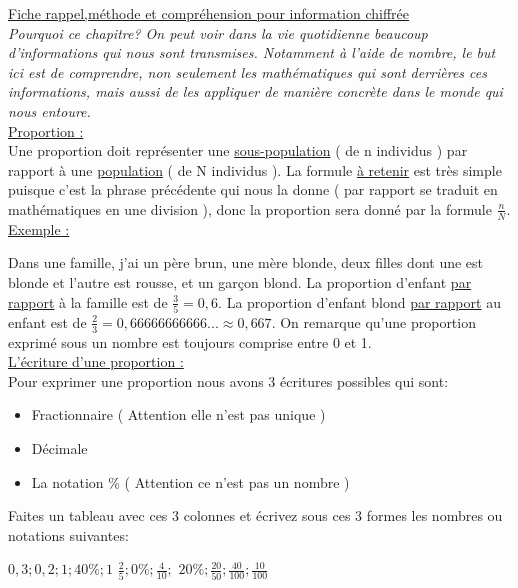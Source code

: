 \documentclass[french]{book}
\begin{document}
\thispagestyle{empty}

\underline{Fiche rappel,méthode et compréhension pour information chiffrée}\\


\textit{Pourquoi ce chapitre? On peut voir dans la vie quotidienne beaucoup d’informations qui nous sont transmises. Notamment à l’aide de nombre, le but ici est de comprendre, non seulement les mathématiques qui sont derrières ces informations, mais aussi de les appliquer de manière concrète dans le monde qui nous entoure.}\\
 

\underline{Proportion :}\\

Une proportion doit représenter une \underline{sous-population} ( de n individus ) par rapport à une \underline{population} ( de N individus ). La formule \underline{à retenir} est très simple puisque c’est la phrase précédente qui nous la donne ( par rapport se traduit en mathématiques en une division ), donc la proportion sera donné par la formule $\frac{n}{N}$.\\

\underline{Exemple :}

Dans une famille, j’ai un père brun, une mère blonde, deux filles dont une est blonde et l’autre est rousse, et un garçon blond.
La proportion d’enfant \underline{par rapport} à la famille  est de $\frac{3}{5} = 0,6$.
La proportion d’enfant blond \underline{par rapport} au enfant est de $\frac{2}{3} =0,66666666666... \approx 0,667$.
On remarque qu’une proportion exprimé sous un nombre est toujours comprise entre 0 et 1.\\

\underline{L’écriture d’une proportion :}\\

Pour exprimer une proportion nous avons 3 écritures possibles qui sont: 

\begin{itemize}   
\item Fractionnaire ( Attention elle n’est pas unique ) 
\item Décimale 
\item La notation \% ( Attention ce n’est pas un nombre ) 
\end{itemize}

 
Faites un tableau avec ces 3 colonnes et écrivez sous ces 3 formes les nombres ou notations suivantes:

$0,3 ; 0,2 ; 1 ; 40\% ; 1$
$\frac{2}{5}; 0\% ;  \frac{4}{10};$
$20\% ; \frac{20}{50} ; \frac{40}{100} ; \frac{10}{100}$ \\
\end{document}

